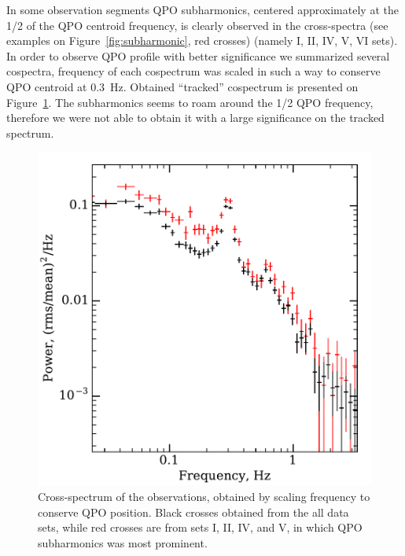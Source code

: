\documentclass[a4paper,fleqn,usenatbib]{mnras}
\begin{document}
In some observation segments QPO subharmonics, centered approximately at the 1/2 of the QPO centroid frequency, is clearly observed in the cross-spectra (see examples on Figure~\ref{fig:subharmonic}, red crosses) (namely I, II, IV, V, VI sets).
In order to observe QPO profile with better significance we summarized several cospectra, frequency of each cospectrum was scaled in such a way to conserve QPO centroid at 0.3~Hz.
Obtained ``tracked'' cospectrum is presented on Figure~\ref{fig:cospec_tracked}.
The subharmonics seems to roam around the 1/2 QPO frequency, therefore we were not able to obtain it with a large significance on the tracked spectrum.


\begin{figure}
        \includegraphics[width=\columnwidth]{folded_cospectr2.pdf}
        \caption{Cross-spectrum of the observations, obtained by scaling frequency to conserve QPO position.
        Black crosses obtained from the all data sets, while red crosses are from sets I, II, IV, and V, in which QPO subharmonics was most prominent.}
        \label{fig:cospec_tracked}
\end{figure}
\end{document}
